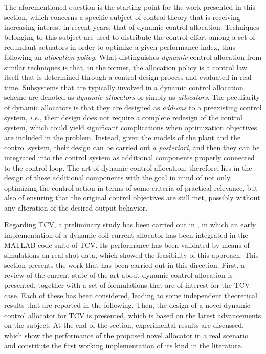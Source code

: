The aforementioned question is the starting point for the work presented in this section, which concerns a specific subject of control theory that is receiving increasing interest in recent years: that of dynamic control allocation. Techniques belonging to this subject are used to distribute the control effort among a set of redundant actuators in order to optimize a given performance index, thus following an \emph{allocation policy}. What distinguishes \emph{dynamic} control allocation from similar techniques is that, in the former, the allocation policy is a control law itself that is determined through a control design process and evaluated in real-time. Subsystems that are typically involved in a dynamic control allocation scheme are denoted as \emph{dynamic allocators} or simply as \emph{allocators}. The peculiarity of dynamic allocators is that they are designed as \emph{add-ons} to a preexisting control system, \emph{i.e.}, their design does not require a complete redesign of the control system, which could yield significant complications when optimization objectives are included in the problem. Instead, given the models of the plant and the control system, their design can be carried out \emph{a posteriori}, and then they can be integrated into the control system as additional components properly connected to the control loop. The art of dynamic control allocation, therefore, lies in the design of these additional components with the goal in mind of not only optimizing the control action in terms of some criteria of practical relevance, but also of ensuring that the original control objectives are still met, possibly without any alteration of the desired output behavior.

Regarding TCV, a preliminary study has been carried out in \cite{tenaglia_dynamic_2024}, in which an early implementation of a dynamic coil current allocator has been integrated in the MATLAB code suite of TCV. Its performance has been validated by means of simulations on real shot data, which showed the feasibility of this approach. This section presents the work that has been carried out in this direction. First, a review of the current state of the art about dynamic control allocation is presented, together with a set of formulations that are of interest for the TCV case. Each of these has been considered, leading to some independent theoretical results that are reported in the following. Then, the design of a novel dynamic control allocator for TCV is presented, which is based on the latest advancements on the subject. At the end of the section, experimental results are discussed, which show the performance of the proposed novel allocator in a real scenario and constitute the first working implementation of its kind in the literature.

